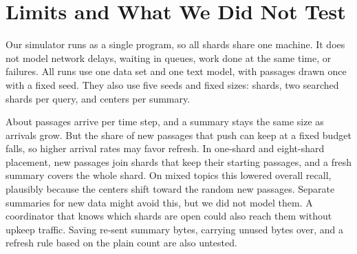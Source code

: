 \section{Limits and What We Did Not Test}
\label{sec:limits}

Our simulator runs as a single program, so all shards share one machine.
It does not model network delays, waiting in queues, work done at the same time, or failures.
All runs use one data set and one text model, with \RNumCorpusTotalPassages{} passages drawn once with a fixed seed.
They also use five seeds and fixed sizes: \RNumNumShards{} shards, two searched shards per query, and \RNumCentersPerSummary{} centers per summary.

About \RNumSteadyEpochInsertVecs{} passages arrive per time step, and a summary stays the same size as arrivals grow.
But the share of new passages that push can keep at a fixed budget falls, so higher arrival rates may favor refresh.
In one-shard and eight-shard placement, new passages join shards that keep their starting passages, and a fresh summary covers the whole shard.
On mixed topics this lowered overall recall, plausibly because the centers shift toward the random new passages.
Separate summaries for new data might avoid this, but we did not model them.
A coordinator that knows which shards are open could also reach them without upkeep traffic.
Saving re-sent summary bytes, carrying unused bytes over, and a refresh rule based on the plain count are also untested.
